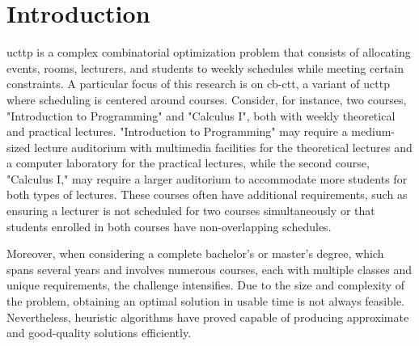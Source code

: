 
\chapter{Introduction}


\label{Introduction}


\ac{ucttp} is a complex combinatorial optimization problem that consists of allocating events, rooms, lecturers, and students to weekly schedules while meeting certain constraints. A particular focus of this research is on \ac{cb-ctt}, a variant of \ac{ucttp} where scheduling is centered around courses. Consider, for instance, two courses, "Introduction to Programming" and "Calculus I", both with weekly theoretical and practical lectures. "Introduction to Programming" may require a medium-sized lecture auditorium with multimedia facilities for the theoretical lectures and a computer laboratory for the practical lectures, while the second course, "Calculus I," may require a larger auditorium to accommodate more students for both types of lectures. These courses often have additional requirements, such as ensuring a lecturer is not scheduled for two courses simultaneously or that students enrolled in both courses have non-overlapping schedules. 

Moreover, when considering a complete bachelor’s or master’s degree, which spans several years and involves numerous courses, each with multiple classes and unique requirements, the challenge intensifies. Due to the size and complexity of the problem, obtaining an optimal solution in usable time is not always feasible. Nevertheless, heuristic algorithms have proved capable of producing approximate and good-quality solutions efficiently. 

